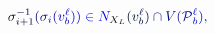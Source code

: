 \documentclass[12pt]{article}
\begin{document}
\makeatletter
\renewcommand*{\@textcolor}[3]{%
  \protect\leavevmode
  \begingroup
    \color#1{#2}#3%
  \endgroup
}
\makeatother
\begin{displaymath}
\mathcolor[RGB]{0,0,15}{\sigma} _ { \mathcolor[RGB]{0,0,30}{i} \mathcolor[RGB]{0,0,45}{+} \mathcolor[RGB]{0,0,60}{1} } ^ { \mathcolor[RGB]{0,0,75}{-} \mathcolor[RGB]{0,0,90}{1} } \mathcolor[RGB]{0,0,105}{(} \mathcolor[RGB]{0,0,120}{\sigma} _ { \mathcolor[RGB]{0,0,135}{i} } \mathcolor[RGB]{0,0,150}{(} \mathcolor[RGB]{0,0,165}{v} _ { \mathcolor[RGB]{0,0,180}{b} } ^ { \mathcolor[RGB]{0,0,195}{\ell} } \mathcolor[RGB]{0,0,210}{)} \mathcolor[RGB]{0,0,225}{)} \mathcolor[RGB]{0,0,240}{\in} \mathcolor[RGB]{0,0,255}{N} _ { \mathcolor[RGB]{0,15,0}{X} _ { \mathcolor[RGB]{0,15,15}{L} } } \mathcolor[RGB]{0,15,30}{(} \mathcolor[RGB]{0,15,45}{v} _ { \mathcolor[RGB]{0,15,60}{b} } ^ { \mathcolor[RGB]{0,15,75}{\ell} } \mathcolor[RGB]{0,15,90}{)} \mathcolor[RGB]{0,15,105}{\cap} \mathcolor[RGB]{0,15,120}{V} \mathcolor[RGB]{0,15,135}{(} \mathcal { \mathcolor[RGB]{0,15,150}{P} } _ { \mathcolor[RGB]{0,15,165}{b} } ^ { \mathcolor[RGB]{0,15,180}{\ell} } \mathcolor[RGB]{0,15,195}{)} \mathcolor[RGB]{0,15,210}{,}
\end{displaymath}
\end{document}
